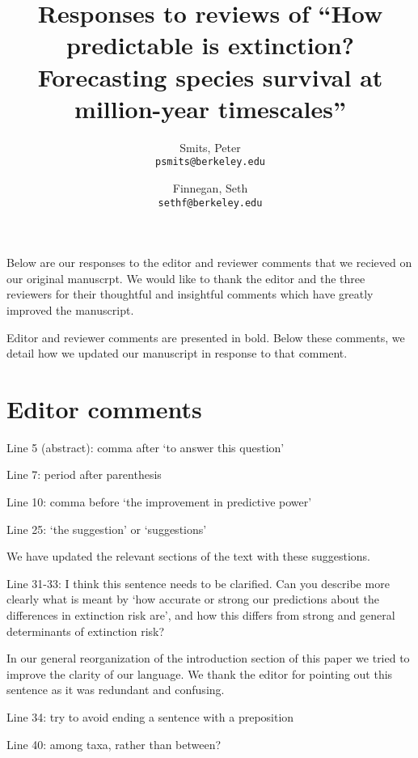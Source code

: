 \documentclass[12pt,letterpaper]{article}
\title{Responses to reviews of ``How predictable is extinction? Forecasting species survival at million-year timescales''}
\author{
 Smits, Peter\\
 \texttt{psmits@berkeley.edu} 
 \and
 Finnegan, Seth\\
 \texttt{sethf@berkeley.edu}
}
\date{}
\begin{document}
\begin{refsection}

\maketitle

\linenumbers{}
\modulolinenumbers[3]


Below are our responses to the editor and reviewer comments that we recieved on our original manuscrpt. We would like to thank the editor and the three reviewers for their thoughtful and insightful comments which have greatly improved the manuscript.

Editor and reviewer comments are presented in bold. Below these comments, we detail how we updated our manuscript in response to that comment. 


\section{Editor comments}

\begin{bfseries}
  Line 5 (abstract): comma after ‘to answer this question’

  Line 7: period after parenthesis

  Line 10: comma before ‘the improvement in predictive power’

  Line 25: ‘the suggestion’ or ‘suggestions’
\end{bfseries}

We have updated the relevant sections of the text with these suggestions.


\begin{bfseries}
  Line 31-33: I think this sentence needs to be clarified. Can you describe more clearly what is meant by ‘how accurate or strong our predictions about the differences in extinction risk are’, and how this differs from strong and general determinants of extinction risk?
\end{bfseries}

In our general reorganization of the introduction section of this paper we tried to improve the clarity of our language. We thank the editor for pointing out this sentence as it was redundant and confusing. 


\begin{bfseries}
  Line 34: try to avoid ending a sentence with a preposition 

  Line 40: among taxa, rather than between?


\end{bfseries}
\end{refsection}
\end{document}
